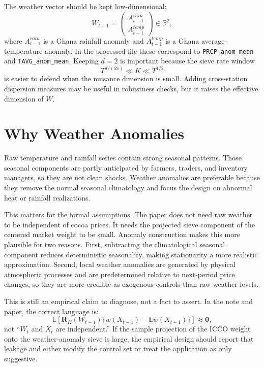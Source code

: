 \documentclass[11pt]{article}
\begin{document}
The weather vector should be kept low-dimensional:
\begin{equation}
    W_{t-1}=
    \begin{pmatrix}
        A^{rain}_{t-1}\\
        A^{temp}_{t-1}
    \end{pmatrix}
    \in\mathbb R^2,
    \label{eq:weather-vector}
\end{equation}
where \(A^{rain}_{t-1}\) is a Ghana rainfall anomaly and \(A^{temp}_{t-1}\) is a Ghana average-temperature anomaly. In the processed file these correspond to \texttt{PRCP\_anom\_mean} and \texttt{TAVG\_anom\_mean}. Keeping \(d=2\) is important because the sieve rate window
\[
    T^{d/(2s)}\ll K\ll T^{1/2}
\]
is easier to defend when the nuisance dimension is small. Adding cross-station dispersion measures may be useful in robustness checks, but it raises the effective dimension of \(W\).

\section{Why Weather Anomalies}

Raw temperature and rainfall series contain strong seasonal patterns. Those seasonal components are partly anticipated by farmers, traders, and inventory managers, so they are not clean shocks. Weather anomalies are preferable because they remove the normal seasonal climatology and focus the design on abnormal heat or rainfall realizations.

This matters for the formal assumptions. The paper does not need raw weather to be independent of cocoa prices. It needs the projected sieve component of the centered market weight to be small. Anomaly construction makes this more plausible for two reasons. First, subtracting the climatological seasonal component reduces deterministic seasonality, making stationarity a more realistic approximation. Second, local weather anomalies are generated by physical atmospheric processes and are predetermined relative to next-period price changes, so they are more credible as exogenous controls than raw weather levels.

This is still an empirical claim to diagnose, not a fact to assert. In the note and paper, the correct language is:
\[
    \mathbb E\left[
        \bm R_K(W_{t-1})
        \{w(X_{t-1})-\mathbb E w(X_{t-1})\}
    \right]\approx \bm0,
\]
not ``\(W_t\) and \(X_t\) are independent.'' If the sample projection of the ICCO weight onto the weather-anomaly sieve is large, the empirical design should report that leakage and either modify the control set or treat the application as only suggestive.
\end{document}
